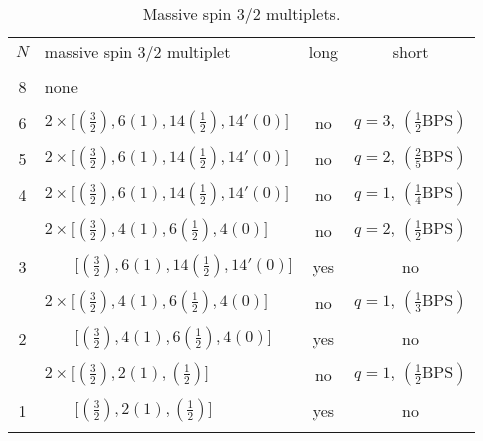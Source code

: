 \documentclass[a4paper,12pt]{article}
\begin{document}
\begin{table}[p]
\begin{center}
\begin{tabular} {|c|l|c|c|}
\cline{1-4}  $N$& massive spin 3/2 multiplet& long  &short
\\ \cline{1-4}&&&\\
8&none&&\\&&&\\
6&$2\times\bigl[(\frac{3}{2}),6(1),14(\frac{1}{2}),
14'(0)\bigr]$&no&$q=3,\,(\frac{1}{2}\mathrm{BPS})$\\&&& \\
5&$2\times\bigl[(\frac{3}{2}),6(1),14(\frac{1}{2}),
14'(0)\bigr]$&no&$q=2,\,(\frac{2}{5}\mathrm{BPS})$\\&&&\\
4&$2\times\bigl[(\frac{3}{2}),6(1),14(\frac{1}{2}),
14'(0)\bigr]$&no&$q=1,\,(\frac{1}{4}\mathrm{BPS})$\\&&&\\
&$2\times\bigl[(\frac{3}{2}),4(1),6(\frac{1}{2}),
4(0)\bigr]$&no&$q=2,\,(\frac{1}{2}\mathrm{BPS})$\\&&&\\
3&$\quad\;\;\;\bigl[(\frac{3}{2}),6(1),14(\frac{1}{2}),
14'(0)\bigr]$&yes&no\\&&&\\
&$2\times\bigl[(\frac{3}{2}),4(1),6(\frac{1}{2}),
4(0)\bigr]$&no&$q=1,\,(\frac{1}{3}\mathrm{BPS})$\\&&&\\
2&$\quad\;\;\;\bigl[(\frac{3}{2}),4(1),6(\frac{1}{2}),
4(0)\bigr]$&yes&no\\&&&\\
&$2\times\bigl[(\frac{3}{2}),2(1),(\frac{1}{2})\bigr]$&no&$q=1,\,(\frac{1}{2}
\mathrm{BPS})$\\&&&\\
1&$\quad\;\;\;\bigl[(\frac{3}{2}),2(1),(\frac{1}{2})\bigr]$&yes&no\\&&&\\
\cline{1-4}
\end{tabular}
\caption{Massive spin 3/2 multiplets.}\label{spin3/2}
\end{center}
\end{table}
\end{document}
